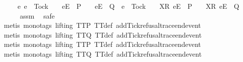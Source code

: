 \begin{isabellebody}
\ \ \ \ {\isasymsubseteq}\ {\isacharbraceleft}e{\isachardot}\ e\ {\isasymnoteq}\ Tock\ {\isasymand}\ {\isasymrho}{\isacharprime}\ {\isacharat}\ {\isacharbrackleft}{\isacharbrackleft}e{\isacharbrackright}\isactrlsub E{\isacharbrackright}\ {\isasymin}\ P\ {\isasymand}\ {\isasymrho}{\isacharprime}\ {\isacharat}\ {\isacharbrackleft}{\isacharbrackleft}e{\isacharbrackright}\isactrlsub E{\isacharbrackright}\ {\isasymin}\ Q\ {\isasymor}\ e\ {\isacharequal}\ Tock\ {\isasymand}\ {\isasymrho}{\isacharprime}\ {\isacharat}\ {\isacharbrackleft}{\isacharbrackleft}X{\isacharbrackright}\isactrlsub R{\isacharcomma}\ {\isacharbrackleft}e{\isacharbrackright}\isactrlsub E{\isacharbrackright}\ {\isasymin}\ P\ {\isasymand}\ {\isasymrho}{\isacharprime}\ {\isacharat}\ {\isacharbrackleft}{\isacharbrackleft}X{\isacharbrackright}\isactrlsub R{\isacharcomma}\ {\isacharbrackleft}e{\isacharbrackright}\isactrlsub E{\isacharbrackright}\ {\isasymin}\ Q{\isacharbraceright}{\isachardoublequoteclose}\isanewline
\ \ \ \ \isamarkupfalse%
\ assm{}\ \isamarkupfalse%
\ {\isacharparenleft}safe{\isacharparenright}\isanewline
\ \ \ \ \isamarkupfalse%
\ {\isacharparenleft}metis\ {\isacharparenleft}mono{\isacharunderscore}tags{\isacharcomma}\ lifting{\isacharparenright}\ TT{}{\isacharunderscore}P\ TT{}{\isacharunderscore}def\ add{\isacharunderscore}Tick{\isacharunderscore}refusal{\isacharunderscore}trace{\isacharunderscore}end{\isacharunderscore}event{\isacharparenright}\isanewline
\ \ \ \ \isamarkupfalse%
\ {\isacharparenleft}metis\ {\isacharparenleft}mono{\isacharunderscore}tags{\isacharcomma}\ lifting{\isacharparenright}\ TT{}{\isacharunderscore}Q\ TT{}{\isacharunderscore}def\ add{\isacharunderscore}Tick{\isacharunderscore}refusal{\isacharunderscore}trace{\isacharunderscore}end{\isacharunderscore}event{\isacharparenright}\isanewline
\ \ \ \ \isamarkupfalse%
\ {\isacharparenleft}metis\ {\isacharparenleft}mono{\isacharunderscore}tags{\isacharcomma}\ lifting{\isacharparenright}\ TT{}{\isacharunderscore}P\ TT{}{\isacharunderscore}def\ add{\isacharunderscore}Tick{\isacharunderscore}refusal{\isacharunderscore}trace{\isacharunderscore}end{\isacharunderscore}event{\isacharparenright}\isanewline
\ \ \ \ \isamarkupfalse%
\ {\isacharparenleft}metis\ {\isacharparenleft}mono{\isacharunderscore}tags{\isacharcomma}\ lifting{\isacharparenright}\ TT{}{\isacharunderscore}Q\ TT{}{\isacharunderscore}def\ add{\isacharunderscore}Tick{\isacharunderscore}refusal{\isacharunderscore}trace{\isacharunderscore}end{\isacharunderscore}event{\isacharparenright}\isanewline

\end{isabellebody}
